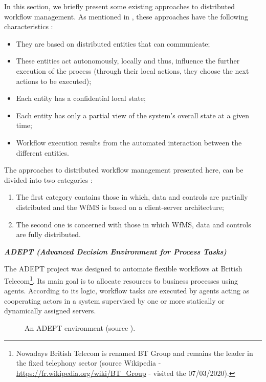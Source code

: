 \label{chap1:sec:some-p2p-wfms}
In this section, we briefly present some existing approaches to distributed workflow management. As mentioned in \cite{theseKanzow}, these approaches have the following characteristics :
\begin{itemize}
	\item They are based on distributed entities that can communicate;
	\item These entities act autonomously, locally and thus, influence the further execution of the process (through their local actions, they choose the next actions to be executed);
	\item Each entity has a confidential local state;
	\item Each entity has only a partial view of the system's overall state at a given time;
	\item Workflow execution results from the automated interaction between the different entities.
\end{itemize}
The approaches to distributed workflow management presented here, can be divided into two categories :
\begin{enumerate}
	\item The first category contains those in which, data and controls are partially distributed and the WfMS is based on a client-server architecture;
	\item The second one is concerned with those in which WfMS, data and controls are fully distributed.
\end{enumerate}

\label{chap1:sec:partially-distributed-wfms}
\noindent\textbf{\textit{ADEPT (Advanced Decision Environment for Process Tasks) \cite{adept}}}

The ADEPT project was designed to automate flexible workflows at British Telecom\footnote{Nowadays British Telecom is renamed BT Group and remains the leader in the fixed telephony sector (source Wikipedia - \url{https://fr.wikipedia.org/wiki/BT_Group} - visited the 07/03/2020).}. Its main goal is to allocate resources to business processes using agents. According to its logic, workflow tasks are executed by agents acting as cooperating actors in a system supervised by one or more statically or dynamically assigned servers.
\begin{figure}[ht!]
	\noindent
	\caption{An ADEPT environment (source \cite{adept}).}
	\label{chap1:fig:adept}
\end{figure}

